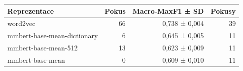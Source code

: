 \begin{tabular}{lrrr}
\toprule
Reprezentace & Pokus & Macro-MaxF1 ± SD & Pokusy\\
\midrule
word2vec & 66 & 0,738 ± 0,004 & 39\\
mmbert-base-mean-dictionary & 6 & 0,645 ± 0,005 & 11\\
mmbert-base-mean-512 & 13 & 0,623 ± 0,009 & 11\\
mmbert-base-mean & 0 & 0,609 ± 0,010 & 11\\
\bottomrule
\end{tabular}
